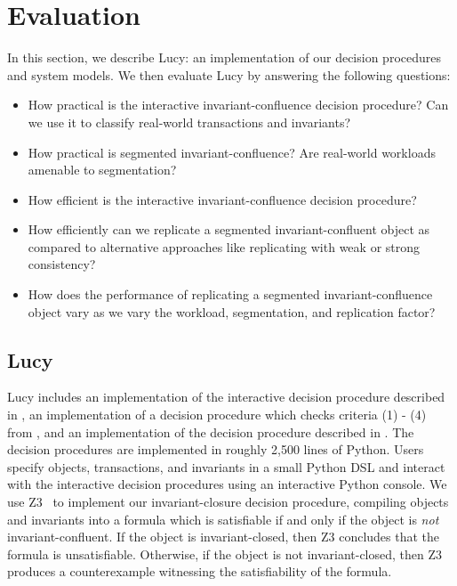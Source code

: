 \section{Evaluation}
In this section, we describe Lucy: an implementation of our decision procedures
and system models. We then evaluate Lucy by answering the following questions:
\begin{itemize}
  \item
    How practical is the interactive invariant-confluence decision procedure?
    Can we use it to classify real-world transactions and invariants?
  \item
    How practical is segmented invariant-confluence? Are real-world workloads
    amenable to segmentation?
  \item
    How efficient is the interactive invariant-confluence decision procedure?
  \item
    How efficiently can we replicate a segmented invariant-confluent object as
    compared to alternative approaches like replicating with weak or strong
    consistency?
  \item
    How does the performance of replicating a segmented invariant-confluence
    object vary as we vary the workload, segmentation, and replication factor?
\end{itemize}

\subsection{Lucy}
Lucy includes an implementation of the interactive decision procedure described
in , an implementation of a decision
procedure which checks criteria (1) - (4) from , and an
implementation of the decision procedure described in
. The decision procedures
are implemented in roughly 2,500 lines of Python. Users specify objects,
transactions, and invariants in a small Python DSL and interact with the
interactive decision procedures using an interactive Python console. We use
Z3~\cite{de2008z3} to implement our invariant-closure decision procedure,
compiling objects and invariants into a formula which is satisfiable if and
only if the object is \emph{not} invariant-confluent. If the object is
invariant-closed, then Z3 concludes that the formula is unsatisfiable.
Otherwise, if the object is not invariant-closed, then Z3 produces a
counterexample witnessing the satisfiability of the formula.

